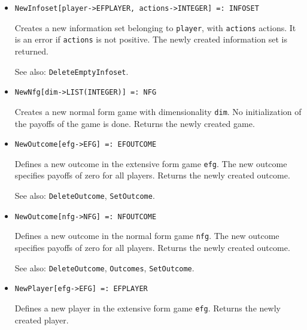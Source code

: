 \begin{itemize}
\item{}
\protect \large \begin{verbatim} 
NewInfoset[player->EFPLAYER, actions->INTEGER] =: INFOSET 
\end{verbatim}\normalsize

\bd
Creates a new information set belonging to \verb+player+, with
\verb+actions+ actions.  It is an error if \verb+actions+ is not
positive.  The newly created information set is returned.
\item [See also:] \verb+DeleteEmptyInfoset+.
\ed

\item{}
\protect \large \begin{verbatim}
NewNfg[dim->LIST(INTEGER)] =: NFG 
\end{verbatim}\normalsize

\bd 
Creates a new normal form game with dimensionality \verb+dim+.  No
initialization of the payoffs of the game is done.  Returns the newly
created game.  
\ed

\item{}
\protect \large \begin{verbatim} 
NewOutcome[efg->EFG] =: EFOUTCOME 
\end{verbatim}\normalsize


\bd 
Defines a new outcome in the extensive form game \verb+efg+.  The new
outcome specifies payoffs of zero for all players.  Returns the newly
created outcome.
\item [See also:] \verb+DeleteOutcome+, \verb+SetOutcome+.
\ed


\item{}
\protect \large \begin{verbatim} 
NewOutcome[nfg->NFG] =: NFOUTCOME 
\end{verbatim}\normalsize

\bd 
Defines a new outcome in the normal form game \verb+nfg+.  The new
outcome specifies payoffs of zero for all players.  Returns the newly
created outcome.
\item [See also:] \verb+DeleteOutcome+, \verb+Outcomes+,
\verb+SetOutcome+.
\ed


\item{}
\protect \large \begin{verbatim}
NewPlayer[efg->EFG] =: EFPLAYER 
\end{verbatim}\normalsize

\bd 
Defines a new player in the extensive form game \verb+efg+.  Returns
the newly created player.  
\ed


\end{itemize}
